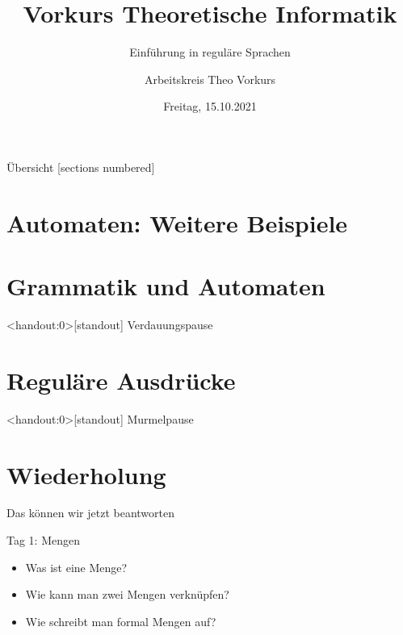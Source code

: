 

\title{Vorkurs Theoretische Informatik}
\subtitle{Einführung in reguläre Sprachen}
\date{Freitag, 15.10.2021}
\author{Arbeitskreis  Theo Vorkurs}



\maketitle

\begin{frame}[fragile]{Übersicht}
    [sections numbered]
    \tableofcontents%
\end{frame}

\section{Automaten: Weitere Beispiele}



\section{Grammatik und Automaten}



\begin{frame}<handout:0>[standout]
    Verdauungspause
\end{frame}

\section{Reguläre Ausdrücke}



\begin{frame}<handout:0>[standout]
    Murmelpause
\end{frame}

\section{Wiederholung}
\begin{frame}[fragile]{Das können wir jetzt beantworten}
    \begin{alertblock}{Tag 1: Mengen}
        \begin{itemize}
            \item Was ist eine Menge?
            \item Wie kann man zwei Mengen verknüpfen?
            \item Wie schreibt man formal Mengen auf?
        \end{itemize}
    \end{alertblock}
\end{frame}


